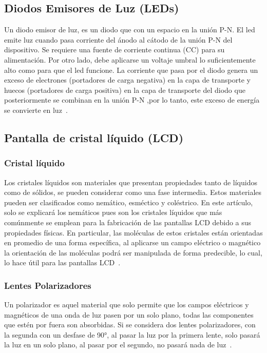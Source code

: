 \documentclass[twocolumn]{article}
\begin{document}
\subsection{Diodos Emisores de Luz (LEDs)}
Un diodo emisor de luz, es un diodo que con un espacio en la unión P-N. El led emite luz cuando pasa corriente del ánodo al cátodo de la unión P-N del dispositivo. Se requiere una fuente de corriente continua (CC) para su alimentación. Por otro lado, debe aplicarse un voltaje umbral lo suficientemente alto como para que el led funcione. La corriente que pasa por el diodo genera un exceso de electrones (portadores de carga negativa) en la capa de transporte y huecos (portadores de carga positiva) en la capa de transporte del diodo que posteriormente se combinan en la unión P-N ,por lo tanto, este exceso de energía se convierte en luz~\cite{singh2013comparative}.

\subsection{Pantalla de cristal líquido (LCD)}

\subsubsection{Cristal líquido}
Los cristales líquidos son materiales que presentan propiedades tanto de líquidos como de sólidos, se pueden considerar como una fase intermedia. Estos materiales pueden ser clasificados como nemático, esméctico y coléstrico. En este artículo, solo se explicará los nemáticos pues son los cristales líquidos que más comúnmente se emplean para la fabricación de las pantallas LCD debido a sus propiedades físicas. En particular, las moléculas de estos cristales están orientadas en promedio de una forma específica, al aplicarse un campo eléctrico o magnético la orientación de las moléculas podrá ser manipulada de forma predecible, lo cual, lo hace útil para las pantallas LCD~\cite{gurski2005display}.

\subsubsection{Lentes Polarizadores}
Un polarizador es aquel material que solo permite que los campos eléctricos y magnéticos de una onda de luz pasen por un solo plano, todas las componentes que estén por fuera son absorbidas. Si se considera dos lentes polarizadores, con la segunda con un desfase de 90°, al pasar la luz por la primera lente, solo pasará la luz en un solo plano, al pasar por el segundo, no pasará nada de luz~\cite{gurski2005display}.
\end{document}
